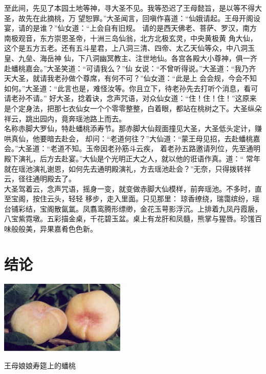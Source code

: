 \documentclass[UTF8,a4paper,11pt,onecolumn,twoside]{ctexart}
\makeatletter
\newenvironment{figurehere}
{\def\@captype{figure}}
{}
\makeatother
\begin{document}
\begin{multicols}{2}
至此间，先见了本园土地等神，寻大圣不见。我等恐迟了王母懿旨，是以等不得大圣，故先在此摘桃，万
望恕罪。”大圣闻言，回嗔作喜道：“仙娥请起。王母开阁设宴，请的是谁？”仙女道：“上会自有旧规。
请的是西天佛老、菩萨、罗汉，南方南极观音，东方崇恩圣帝，十洲三岛仙翁，北方北极玄灵，中央黄极黄
角大仙，这个是五方五老。还有五斗星君，上八洞三清、四帝、太乙天仙等众，中八洞玉皇、九垒、海岳神
仙，下八洞幽冥教主、注世地仙。各宫各殿大小尊神，俱一齐赴蟠桃嘉会。”大圣笑道：“可请我么？”仙
女说：“不曾听得说。”大圣道：“我乃齐天大圣，就请我老孙做个尊席，有何不可？”仙女道：“此是上
会会规，今会不知如何。”大圣道：“此言也是，难怪汝等。你且立下，待老孙先去打听个消息，看可请老孙不请。”
好大圣，捻着诀，念声咒语，对众仙女道：“住！住！住！”这原来是个定身法，把那七衣仙女一个个零零整整，白着眼，都站在桃树之下。大圣纵朵祥云，跳出园内，竟奔瑶池路上而去。\\
\indent 名称赤脚大罗仙，特赴蟠桃添寿节。那赤脚大仙觌面撞见大圣，大圣低头定计，赚哄真仙，他要暗去赴会，
却问：“老道何往？”大仙道：“蒙王母见招，去赴蟠桃嘉会。”大圣道：“老道不知。玉帝因老孙筋斗云疾，
着老孙五路邀请列位，先至通明殿下演礼，后方去赴宴。”大仙是个光明正大之人，就以他的诳语作真。道：“
常年就在瑶池演礼谢恩，如何先去通明殿演礼，方去瑶池赴会？”无奈，只得拨转祥云，径往通明殿去了。\\
\indent 大圣驾着云，念声咒语，摇身一变，就变做赤脚大仙模样，前奔瑶池。不多时，直至宝阁，按住云头，轻轻
移步，走入里面。只见那里：
琼香缭绕，瑞霭缤纷，瑶台铺彩结，宝阁散氤氲。凤翥鸾腾形缥缈，金花玉萼影浮沉。上排着九凤丹霞扆，
八宝紫霓墩。五彩描金桌，千花碧玉盆。桌上有龙肝和凤髓，熊掌与猩唇。珍馐百味般般美，异果嘉肴色色新。



\section{结论}

\begin{figurehere}
	\centering
	\includegraphics[width=6cm]{Pantao.jpg}
	\caption{王母娘娘寿筵上的蟠桃}\label{fig2}
\end{figurehere}




\end{multicols}
\end{document}
